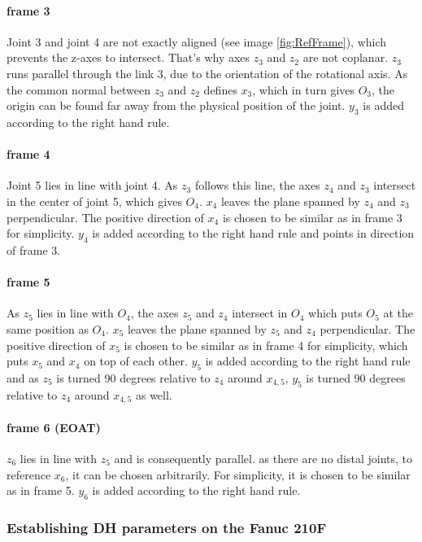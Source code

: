 \paragraph{frame 3}
Joint 3 and joint 4 are not exactly aligned (see image \ref{fig:RefFrame}), which prevents the z-axes to intersect. That's why axes $z_3$ and $z_2$ are not coplanar. 
$z_3$ runs parallel through the link 3, due to the orientation of the rotational axis.
As the common normal between $z_3$ and $z_2$ defines $x_3$, which in turn gives $O_3$, the origin can be found far away from the physical position of the joint.
$y_3$ is added according to the right hand rule.

\paragraph{frame 4}
Joint 5 lies in line with joint 4.
As $z_3$ follows this line, the axes  $z_4$ and $z_3$ intersect in the center of joint 5, which gives $O_4$. 
$x_4$ leaves the plane spanned by  $z_4$ and $z_3$ perpendicular.
The positive direction of $x_4$ is chosen to be similar as in frame 3 for simplicity.
$y_4$ is added according to the right hand rule and points in direction of frame 3.

\paragraph{frame 5}
As $z_5$ lies  in line with $O_4$, the axes  $z_5$ and $z_4$ intersect in $O_4$ which puts $O_5$ at the same position as $O_4$.
$x_5$ leaves the plane spanned by  $z_5$ and $z_4$ perpendicular.
The positive direction of $x_5$ is chosen to be similar as in frame 4 for simplicity, which puts $x_5$ and $x_4$ on top of each other. 
$y_5$ is added according to the right hand rule and as $z_5$ is turned 90 degrees relative to $z_4$ around $x_{4,5}$, $y_5$ is turned 90 degrees relative to $z_4$ around $x_{4,5}$ as well.

\paragraph{frame 6 (EOAT)}
$z_6$ lies in line with $z_5$ and is consequently parallel.
as there are no distal joints, to reference $x_6$, it can be chosen arbitrarily. 
For simplicity, it is chosen to be similar as in frame 5. 
$y_6$ is added according to the right hand rule.


\subsubsection{Establishing \ac{DH} parameters on the Fanuc 210F}


